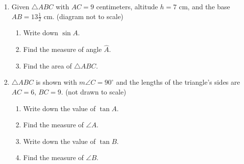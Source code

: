 \documentclass[12pt, twoside]{article}
\begin{document}
\begin{enumerate}
\item Given $\triangle ABC$ with $AC=9$ centimeters, altitude $h=7$ cm, and the base $AB=13 \frac{1}{2}$ cm. (diagram not to scale)
\begin{multicols}{2}
  \begin{enumerate}
    \item Write down $\sin A$.
    \item Find the measure of angle $\hat{A}$.
    \item Find the area of $\triangle ABC$. 
  \end{enumerate}
\end{multicols}
\vspace{1cm}

\newpage
\item $\triangle ABC$ is shown with $m\angle C=90^\circ$ and the lengths of the triangle's sides are $AC=6$, $BC=9$.  \hfill (not drawn to scale)
  \begin{multicols}{2}
    \begin{enumerate}
      \item Write down the value of $\tan A$. \vspace{1.25cm}
      \item Find the measure of $\angle A$. \vspace{1cm}
      \item Write down the value of $\tan B$. \vspace{1.25cm}
      \item Find the measure of $\angle B$. \vspace{1cm}
    \end{enumerate}
    \begin{flushright}
    \end{flushright}
  \end{multicols}
  \vspace{2cm}
  


\end{enumerate}
\end{document}
